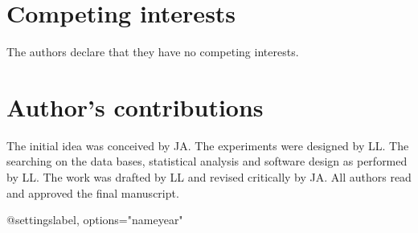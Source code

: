 \documentclass{bmcart}
\begin{document}

\begin{backmatter}

\section*{Competing interests}
  The authors declare that they have no competing interests.

\section*{Author's contributions}
  The initial idea was conceived by JA. The experiments were designed by LL. The searching on the data bases, statistical analysis and software design as performed by LL. The work was drafted by LL and revised critically by JA. All authors read and approved the final manuscript.
    


@settings{label, options="nameyear"}
\nocite{label}


\end{backmatter}
\end{document}

